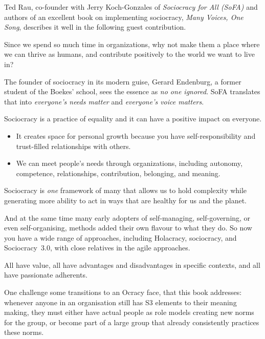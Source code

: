 Ted Rau,  co-founder with Jerry Koch-Gonzales  of \emph{Sociocracy for All (SoFA)} and authors of an excellent book on implementing sociocracy, \emph{Many Voices, One Song}\cite{rau-sociocracy}, describes it well in the following guest contribution.
\begin{longstoryblock}
Since we spend so much time in organizations, why not make them a place where we can thrive as humans, and contribute positively to the world we want to live in? 


The founder of sociocracy in its modern guise, Gerard Endenburg,  a former student of the Boekes’ school, sees the essence as \emph{no one ignored}. SoFA translates that into \emph{everyone's needs matter} and \emph{everyone’s voice matters}.




Sociocracy is a practice of equality and it can have a positive impact on everyone.


\begin{itemize}
\item It creates space for personal growth because you have self-responsibility and trust-filled relationships with others.
\item We can meet people’s needs through organizations, including autonomy, competence, relationships, contribution, belonging, and meaning. 
        \end{itemize}


Sociocracy is \emph{one} framework of many that allows us to hold complexity while generating more ability to act in ways that are healthy for us and the planet.  
\end{longstoryblock}


And at the same time many early adopters of self-managing, self-governing, or even self-organising, methods added their own flavour to what they do. So now you have a wide range of approaches, including Holacracy\cite{robertson-holacracy}, sociocracy\cite{rau-sociocracy}, and Sociocracy~3.0\cite{priest-s3-web,cumps-sociocratie}, with close relatives in the agile approaches. 


All have value, all have advantages and disadvantages in specific contexts, and all have passionate adherents. 


One challenge some transitions to an Ocracy face, that this book addresses: whenever anyone in an organisation still has S3 elements to their meaning making, they must either have actual people as role models creating new norms for the group, or become part of a large group that already consistently practices these norms. 


